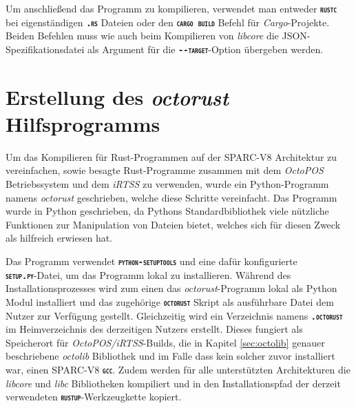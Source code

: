 Um anschließend das Programm zu kompilieren,
verwendet man entweder \texttt{\textsc{\textbf{rustc}}} bei eigenständigen
\texttt{\textsc{\textbf{.rs}}} Dateien oder den \texttt{\textsc{\textbf{cargo build}}} Befehl für \textit{Cargo}-Projekte.
Beiden Befehlen muss wie auch beim Kompilieren von \textit{libcore} die 
JSON-Spezifikationsdatei als Argument für die \texttt{\textsc{\textbf{-{}-target}}}-Option übergeben werden. 

\section{Erstellung des \textit{octorust} Hilfsprogramms}

Um das Kompilieren für Rust-Programmen
auf der SPARC-V8 Architektur zu vereinfachen, sowie
besagte Rust-Programme zusammen mit dem \textit{OctoPOS} Betriebssystem und dem \textit{iRTSS} zu verwenden,
wurde ein Python-Programm namens \textit{octorust} geschrieben, welche diese Schritte
vereinfacht.
Das Programm wurde in Python geschrieben, da Pythons Standardbibliothek viele nützliche Funktionen zur Manipulation
von Dateien bietet, welches sich für diesen Zweck als hilfreich erwiesen hat.

Das Programm verwendet \texttt{\textsc{\textbf{python-setuptools}}} und eine dafür konfigurierte \\
\texttt{\textsc{\textbf{setup.py}}}-Datei, um das Programm lokal zu installieren.
Während des Installationsprozesses wird zum einen das \textit{octorust}-Programm lokal als Python Modul 
installiert und das zugehörige \texttt{\textsc{\textbf{octorust}}} Skript als ausführbare Datei dem Nutzer zur 
Verfügung gestellt.
Gleichzeitig wird ein Verzeichnis namens \texttt{\textsc{\textbf{.octorust}}}
im Heimverzeichnis des derzeitigen Nutzers erstellt.
Dieses fungiert als Speicherort für \textit{OctoPOS/iRTSS}-Builds, die in Kapitel \ref{sec:octolib} genauer
beschriebene \textit{octolib} Bibliothek und im Falle dass kein solcher zuvor installiert war, einen SPARC-V8
\texttt{\textsc{\textbf{gcc}}}.
Zudem werden für alle unterstützten Architekturen die \textit{libcore} und \textit{libc} Bibliotheken
kompiliert und in den Installationspfad der derzeit verwendeten
\texttt{\textsc{\textbf{rustup}}}-Werkzeugkette kopiert.

